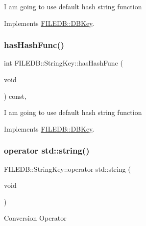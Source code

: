 I am going to use default hash string function 

Implements \mbox{\hyperlink{classFILEDB_1_1DBKey_a541dab4f4083ae951dee2f30483eb18e}{F\+I\+L\+E\+D\+B\+::\+D\+B\+Key}}.

\mbox{\label{classFILEDB_1_1StringKey_afb2fa99d53c0f4b5aeca0377228ea722}} 
\subsubsection{\texorpdfstring{hasHashFunc()}{hasHashFunc()}\hspace{0.1cm}{\footnotesize\ttfamily [3/3]}}
{\footnotesize\ttfamily int F\+I\+L\+E\+D\+B\+::\+String\+Key\+::has\+Hash\+Func (\begin{DoxyParamCaption}\item[{void}]{ }\end{DoxyParamCaption}) const\hspace{0.3cm}{\ttfamily [inline]}, {\ttfamily [virtual]}}

I am going to use default hash string function 

Implements \mbox{\hyperlink{classFILEDB_1_1DBKey_a541dab4f4083ae951dee2f30483eb18e}{F\+I\+L\+E\+D\+B\+::\+D\+B\+Key}}.

\mbox{\label{classFILEDB_1_1StringKey_a4ce28a2e70cc35cbf7dd8f7a9424fbb0}} 
\subsubsection{\texorpdfstring{operator std::string()}{operator std::string()}\hspace{0.1cm}{\footnotesize\ttfamily [1/3]}}
{\footnotesize\ttfamily F\+I\+L\+E\+D\+B\+::\+String\+Key\+::operator std\+::string (\begin{DoxyParamCaption}\item[{void}]{ }\end{DoxyParamCaption})}

Conversion Operator \mbox{\label{classFILEDB_1_1StringKey_a4ce28a2e70cc35cbf7dd8f7a9424fbb0}} 
